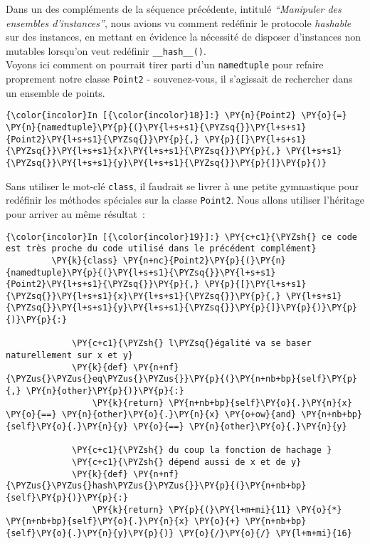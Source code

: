     Dans un des compléments de la séquence précédente, intitulé
\emph{``Manipuler des ensembles d'instances''}, nous avions vu comment
redéfinir le protocole \emph{hashable} sur des instances, en mettant en
évidence la nécessité de disposer d'instances non mutables lorsqu'on
veut redéfinir \texttt{\_\_hash\_\_()}.\\

Voyons ici comment on pourrait tirer parti d'un \texttt{namedtuple} pour
refaire proprement notre classe \texttt{Point2} - souvenez-vous, il
s'agissait de rechercher dans un ensemble de points.

    \begin{Verbatim}[commandchars=\\\{\}]
{\color{incolor}In [{\color{incolor}18}]:} \PY{n}{Point2} \PY{o}{=} \PY{n}{namedtuple}\PY{p}{(}\PY{l+s+s1}{\PYZsq{}}\PY{l+s+s1}{Point2}\PY{l+s+s1}{\PYZsq{}}\PY{p}{,} \PY{p}{[}\PY{l+s+s1}{\PYZsq{}}\PY{l+s+s1}{x}\PY{l+s+s1}{\PYZsq{}}\PY{p}{,} \PY{l+s+s1}{\PYZsq{}}\PY{l+s+s1}{y}\PY{l+s+s1}{\PYZsq{}}\PY{p}{]}\PY{p}{)}
\end{Verbatim}


    Sans utiliser le mot-clé \texttt{class}, il faudrait se livrer à une
petite gymnastique pour redéfinir les méthodes spéciales sur la classe
\texttt{Point2}. Nous allons utiliser l'héritage pour arriver au même
résultat~:

    \begin{Verbatim}[commandchars=\\\{\}]
{\color{incolor}In [{\color{incolor}19}]:} \PY{c+c1}{\PYZsh{} ce code est très proche du code utilisé dans le précédent complément}
         \PY{k}{class} \PY{n+nc}{Point2}\PY{p}{(}\PY{n}{namedtuple}\PY{p}{(}\PY{l+s+s1}{\PYZsq{}}\PY{l+s+s1}{Point2}\PY{l+s+s1}{\PYZsq{}}\PY{p}{,} \PY{p}{[}\PY{l+s+s1}{\PYZsq{}}\PY{l+s+s1}{x}\PY{l+s+s1}{\PYZsq{}}\PY{p}{,} \PY{l+s+s1}{\PYZsq{}}\PY{l+s+s1}{y}\PY{l+s+s1}{\PYZsq{}}\PY{p}{]}\PY{p}{)}\PY{p}{)}\PY{p}{:}
         
             \PY{c+c1}{\PYZsh{} l\PYZsq{}égalité va se baser naturellement sur x et y}
             \PY{k}{def} \PY{n+nf}{\PYZus{}\PYZus{}eq\PYZus{}\PYZus{}}\PY{p}{(}\PY{n+nb+bp}{self}\PY{p}{,} \PY{n}{other}\PY{p}{)}\PY{p}{:}
                 \PY{k}{return} \PY{n+nb+bp}{self}\PY{o}{.}\PY{n}{x} \PY{o}{==} \PY{n}{other}\PY{o}{.}\PY{n}{x} \PY{o+ow}{and} \PY{n+nb+bp}{self}\PY{o}{.}\PY{n}{y} \PY{o}{==} \PY{n}{other}\PY{o}{.}\PY{n}{y}
         
             \PY{c+c1}{\PYZsh{} du coup la fonction de hachage }
             \PY{c+c1}{\PYZsh{} dépend aussi de x et de y}
             \PY{k}{def} \PY{n+nf}{\PYZus{}\PYZus{}hash\PYZus{}\PYZus{}}\PY{p}{(}\PY{n+nb+bp}{self}\PY{p}{)}\PY{p}{:}
                 \PY{k}{return} \PY{p}{(}\PY{l+m+mi}{11} \PY{o}{*} \PY{n+nb+bp}{self}\PY{o}{.}\PY{n}{x} \PY{o}{+} \PY{n+nb+bp}{self}\PY{o}{.}\PY{n}{y}\PY{p}{)} \PY{o}{/}\PY{o}{/} \PY{l+m+mi}{16}
\end{Verbatim}


